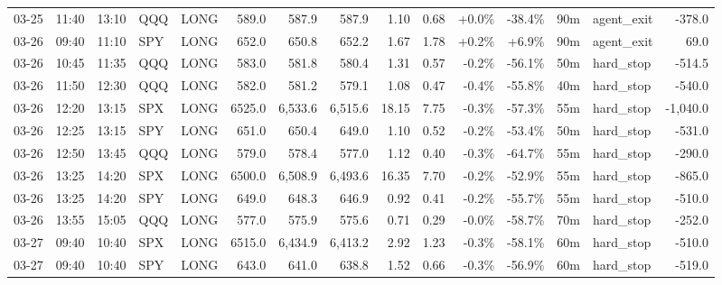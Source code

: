 \documentclass[11pt,a4paper,twoside]{article}
\begin{document}
\begin{landscape}
\begin{center}
\begin{longtable}{>{\color{txtmain}}l l l l l r r r r r r r r >{\color{txtmain}}l r}
03-25 & 11:40 & 13:10 & QQQ & LONG & 589.0 & 587.9 & 587.9 & 1.10 & 0.68 & \textcolor{wingreen}{+0.0\%} & \textcolor{lossred}{-38.4\%} & 90m & agent\_exit & \textcolor{lossred}{-378.0} \\
03-26 & 09:40 & 11:10 & SPY & LONG & 652.0 & 650.8 & 652.2 & 1.67 & 1.78 & \textcolor{wingreen}{+0.2\%} & \textcolor{wingreen}{+6.9\%} & 90m & agent\_exit & \textcolor{wingreen}{69.0} \\
03-26 & 10:45 & 11:35 & QQQ & LONG & 583.0 & 581.8 & 580.4 & 1.31 & 0.57 & \textcolor{lossred}{-0.2\%} & \textcolor{lossred}{-56.1\%} & 50m & hard\_stop & \textcolor{lossred}{-514.5} \\
03-26 & 11:50 & 12:30 & QQQ & LONG & 582.0 & 581.2 & 579.1 & 1.08 & 0.47 & \textcolor{lossred}{-0.4\%} & \textcolor{lossred}{-55.8\%} & 40m & hard\_stop & \textcolor{lossred}{-540.0} \\
03-26 & 12:20 & 13:15 & SPX & LONG & 6525.0 & 6,533.6 & 6,515.6 & 18.15 & 7.75 & \textcolor{lossred}{-0.3\%} & \textcolor{lossred}{-57.3\%} & 55m & hard\_stop & \textcolor{lossred}{-1,040.0} \\
03-26 & 12:25 & 13:15 & SPY & LONG & 651.0 & 650.4 & 649.0 & 1.10 & 0.52 & \textcolor{lossred}{-0.2\%} & \textcolor{lossred}{-53.4\%} & 50m & hard\_stop & \textcolor{lossred}{-531.0} \\
03-26 & 12:50 & 13:45 & QQQ & LONG & 579.0 & 578.4 & 577.0 & 1.12 & 0.40 & \textcolor{lossred}{-0.3\%} & \textcolor{lossred}{-64.7\%} & 55m & hard\_stop & \textcolor{lossred}{-290.0} \\
03-26 & 13:25 & 14:20 & SPX & LONG & 6500.0 & 6,508.9 & 6,493.6 & 16.35 & 7.70 & \textcolor{lossred}{-0.2\%} & \textcolor{lossred}{-52.9\%} & 55m & hard\_stop & \textcolor{lossred}{-865.0} \\
03-26 & 13:25 & 14:20 & SPY & LONG & 649.0 & 648.3 & 646.9 & 0.92 & 0.41 & \textcolor{lossred}{-0.2\%} & \textcolor{lossred}{-55.7\%} & 55m & hard\_stop & \textcolor{lossred}{-510.0} \\
03-26 & 13:55 & 15:05 & QQQ & LONG & 577.0 & 575.9 & 575.6 & 0.71 & 0.29 & \textcolor{lossred}{-0.0\%} & \textcolor{lossred}{-58.7\%} & 70m & hard\_stop & \textcolor{lossred}{-252.0} \\
03-27 & 09:40 & 10:40 & SPX & LONG & 6515.0 & 6,434.9 & 6,413.2 & 2.92 & 1.23 & \textcolor{lossred}{-0.3\%} & \textcolor{lossred}{-58.1\%} & 60m & hard\_stop & \textcolor{lossred}{-510.0} \\
03-27 & 09:40 & 10:40 & SPY & LONG & 643.0 & 641.0 & 638.8 & 1.52 & 0.66 & \textcolor{lossred}{-0.3\%} & \textcolor{lossred}{-56.9\%} & 60m & hard\_stop & \textcolor{lossred}{-519.0} \\

\end{longtable}
\end{center}
\end{landscape}
\end{document}
